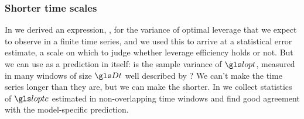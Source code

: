 \subsubsection{Shorter time scales}
In  we derived an expression, , for the variance of optimal leverage that we expect to observe in a finite time series, and we used this to arrive at a statistical error estimate, a scale on which to judge whether leverage efficiency holds or not.
But we can use  as a prediction in itself: is the sample variance of $\lopt$, measured in many windows of size $\Dt$ well described by ? We can't make the time series longer than they are, but we can make the shorter. In  we collect statistics of $\loptc$ estimated in non-overlapping time windows and find good agreement with the model-specific prediction. 
%

